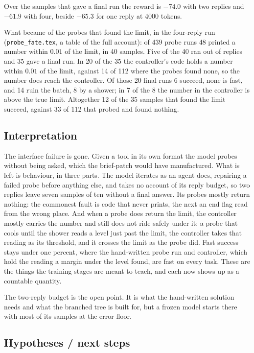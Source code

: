 \documentclass[11pt,a4paper]{article}
\begin{document}
Over the samples that gave a final run the reward is $-74.0$ with two
replies and $-61.9$ with four, beside $-65.3$ for one reply at 4000 tokens.

What became of the probes that found the limit, in the four-reply run
(\texttt{probe\_fate.tex}, a table of the full account): of 439 probe runs
48 printed a number within $0.01$ of the limit, in 40 samples. Five of the
40 ran out of replies and 35 gave a final run. In 20 of the 35 the
controller's code holds a number within $0.01$ of the limit, against 14 of
112 where the probes found none, so the number does reach the controller.
Of those 20 final runs 6 succeed, none is fast, and 14 ruin the batch, 8 by
a shower; in 7 of the 8 the number in the controller is above the true
limit. Altogether 12 of the 35 samples that found the limit succeed,
against 33 of 112 that probed and found nothing.

\subsection*{Interpretation}

The interface failure is gone. Given a tool in its own format the model
probes without being asked, which the brief-patch would have manufactured.
What is left is behaviour, in three parts. The model iterates as an agent
does, repairing a failed probe before anything else, and takes no account
of its reply budget, so two replies leave seven samples of ten without a
final answer. Its probes mostly return nothing: the commonest fault is
code that never prints, the next an end flag read from the wrong place.
And when a probe does return the limit, the controller mostly carries the
number and still does not ride safely under it: a probe that cools until the
shower reads a level just past the limit, the controller takes that reading
as its threshold, and it crosses the limit as the probe did. Fast success
stays under one percent, where the hand-written probe run and controller,
which hold the reading a margin under the level found, are fast on every
task. These are the things the training
stages are meant to teach, and each now shows up as a countable quantity.

The two-reply budget is the open point. It is what the hand-written
solution needs and what the branched tree is built for, but a frozen model
starts there with most of its samples at the error floor.

\subsection*{Hypotheses / next steps}
\end{document}

